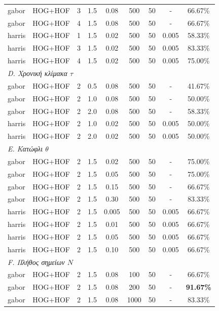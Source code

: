 \documentclass[12pt, a4paper]{article}
\begin{document}
\begin{longtable}{llccccccc}
gabor        & HOG+HOF & 3 & 1.5 & 0.08  & 500 & 50 & - & 66.67\% \\
gabor        & HOG+HOF & 4 & 1.5 & 0.08  & 500 & 50 & - & 66.67\% \\
harris       & HOG+HOF & 1 & 1.5 & 0.02  & 500 & 50 & 0.005 & 58.33\% \\
harris       & HOG+HOF & 3 & 1.5 & 0.02  & 500 & 50 & 0.005 & 83.33\% \\
harris       & HOG+HOF & 4 & 1.5 & 0.02  & 500 & 50 & 0.005 & 75.00\% \\
\midrule
\multicolumn{9}{l}{\textit{D. Χρονική κλίμακα $\tau$}} \\
gabor        & HOG+HOF & 2 & 0.5 & 0.08  & 500 & 50 & - & 41.67\% \\
gabor        & HOG+HOF & 2 & 1.0 & 0.08  & 500 & 50 & - & 50.00\% \\
gabor        & HOG+HOF & 2 & 2.0 & 0.08  & 500 & 50 & - & 58.33\% \\
harris       & HOG+HOF & 2 & 1.0 & 0.02  & 500 & 50 & 0.005 & 50.00\% \\
harris       & HOG+HOF & 2 & 2.0 & 0.02  & 500 & 50 & 0.005 & 50.00\% \\
\midrule
\multicolumn{9}{l}{\textit{E. Κατώφλι $\theta$}} \\
gabor        & HOG+HOF & 2 & 1.5 & 0.02  & 500 & 50 & - & 75.00\% \\
gabor        & HOG+HOF & 2 & 1.5 & 0.05  & 500 & 50 & - & 75.00\% \\
gabor        & HOG+HOF & 2 & 1.5 & 0.15  & 500 & 50 & - & 66.67\% \\
gabor        & HOG+HOF & 2 & 1.5 & 0.30  & 500 & 50 & - & 83.33\% \\
harris       & HOG+HOF & 2 & 1.5 & 0.005 & 500 & 50 & 0.005 & 66.67\% \\
harris       & HOG+HOF & 2 & 1.5 & 0.01  & 500 & 50 & 0.005 & 66.67\% \\
harris       & HOG+HOF & 2 & 1.5 & 0.05  & 500 & 50 & 0.005 & 66.67\% \\
harris       & HOG+HOF & 2 & 1.5 & 0.10  & 500 & 50 & 0.005 & 66.67\% \\
\midrule
\multicolumn{9}{l}{\textit{F. Πλήθος σημείων $N$}} \\
gabor        & HOG+HOF & 2 & 1.5 & 0.08  &  100 & 50 & - & 66.67\% \\
gabor        & HOG+HOF & 2 & 1.5 & 0.08  &  200 & 50 & - & \textbf{91.67\%} \\
gabor        & HOG+HOF & 2 & 1.5 & 0.08  & 1000 & 50 & - & 83.33\% \\

\end{longtable}
\end{document}
